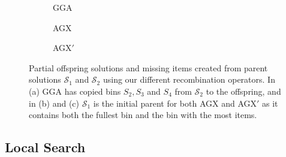 \documentclass[a4paper,11pt,authoryear]{elsarticle}
\begin{document}
\begin{figure}[h!]	
	\centering
	\begin{minipage}{0.28\textwidth}
		
	\end{minipage} \hspace{15mm}
	\begin{minipage}{0.28\textwidth}
		
	\end{minipage}
\end{figure}

\begin{figure}[h!]	
	\centering
	\begin{subfigure}[h]{0.3\textwidth}
		
		\caption{GGA}
		\label{fig:gga}
	\end{subfigure} \hspace{5mm}
	\begin{subfigure}[h]{0.3\textwidth}
		
		\caption{AGX}
		\label{fig:agx}
	\end{subfigure} \hspace{5mm}
	\begin{subfigure}[h]{0.3\textwidth}
		
		\caption{AGX$'$}
		\label{fig:agxdash}
	\end{subfigure}
	\caption{Partial offspring solutions and missing items created from parent solutions $\mathcal{S}_1$ and $\mathcal{S}_2$ using our different recombination operators. In (a) GGA has copied bins $S_2, S_3$ and $S_4$ from $\mathcal{S}_2$ to the offspring, and in (b) and (c) $\mathcal{S}_1$ is the initial parent for both AGX and AGX$'$ as it contains both the fullest bin and the bin with the most items.}
	\label{fig:recomb}
\end{figure}

\subsection{Local Search}
\label{sub:localsearch}
\end{document}
